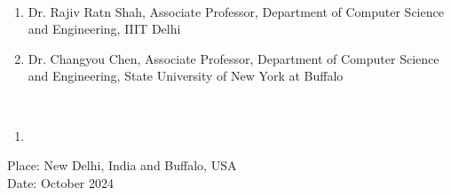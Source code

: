 \begin{singlespacing}
{
 \\
\begin{enumerate}
    \item Dr. Rajiv Ratn Shah, Associate Professor, Department of Computer Science and Engineering, IIIT Delhi
    \item Dr. Changyou Chen, Associate Professor, Department of Computer Science and Engineering, State University of New York at Buffalo
\end{enumerate}


 \\
\begin{enumerate}
\item 
\end{enumerate}



\noindent Place: New Delhi, India and Buffalo, USA\\
\noindent Date: October 2024
} 
\end{singlespacing}
\vspace*{0.25in}